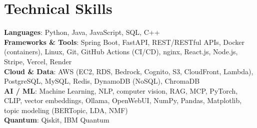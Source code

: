 \documentclass[letterpaper,10pt]{article}
\newcommand{\nk}{\kern0pt}
\begin{document}
\section{Technical Skills}
 \begin{itemize}[leftmargin=0.15in, label={}]
    \small{\item{
     \textbf{Languages}{: Python, Java, JavaScript, SQL, C++} \\
     \textbf{F\nk rameworks \& T\nk ools}{: Spring Boot, FastAPI, REST/RESTful APIs, Docker (containers), Linux, Git, GitHub Actions (CI/CD), nginx, React.js, Node.js, Stripe, Vercel, Render} \\
     \textbf{Cloud \& Data}{: A\nk WS (EC2, RDS, Bedrock, Cognito, S3, CloudFront, Lambda), PostgreSQL, MySQL, Redis, DynamoDB (NoSQL), ChromaDB} \\
     \textbf{AI / ML}{: Machine Learning, NLP, computer vision, RAG, MCP, PyTorch, CLIP, vector embeddings, Ollama, OpenWebUI, NumPy, Pandas, Matplotlib, topic modeling (BERTopic, LDA, NMF)} \\
     \textbf{Quantum}{: Qiskit, IBM Quantum} \\
    }}
 \end{itemize}

\end{document}
